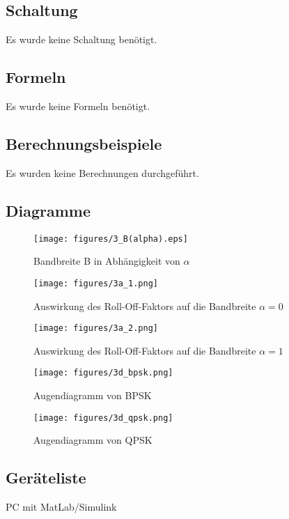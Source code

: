 \documentclass[12pt,a4paper,ngerman]{article}
\begin{document}
\pagebreak


\subsection{Schaltung}
Es wurde keine Schaltung benötigt.

\subsection{Formeln}
Es wurde keine Formeln benötigt.

\subsection{Berechnungsbeispiele}
Es wurden keine Berechnungen durchgeführt.

\subsection{Diagramme}


\begin{figure}[h!]
\centering
\texttt{[image: figures/3\_B(alpha).eps]} 
\caption{Bandbreite B in Abhängigkeit von $\alpha$}
\label{fig:3_B}
\end{figure}

\begin{figure}[h!]
\centering
\texttt{[image: figures/3a\_1.png]} 
\caption{Auswirkung des Roll-Off-Faktors auf die Bandbreite $\alpha=0$}
\label{fig:3_A_1}
\end{figure}

\begin{figure}[h!]	
\centering
\texttt{[image: figures/3a\_2.png]} 
\caption{Auswirkung des Roll-Off-Faktors auf die Bandbreite $\alpha=1$}
\label{fig:3_A_2}
\end{figure}
	
\begin{figure}[h!]
\centering
\texttt{[image: figures/3d\_bpsk.png]} 
\caption{Augendiagramm von BPSK}
\label{fig:3_C}
\end{figure}
	
\begin{figure}[h!]
\centering
\texttt{[image: figures/3d\_qpsk.png]} 
\caption{Augendiagramm von QPSK}
\label{fig:3_D}
\end{figure}
\pagebreak
\pagebreak
	
\clearpage
	
\subsection{Geräteliste}
PC mit MatLab/Simulink	
	
\end{document}
